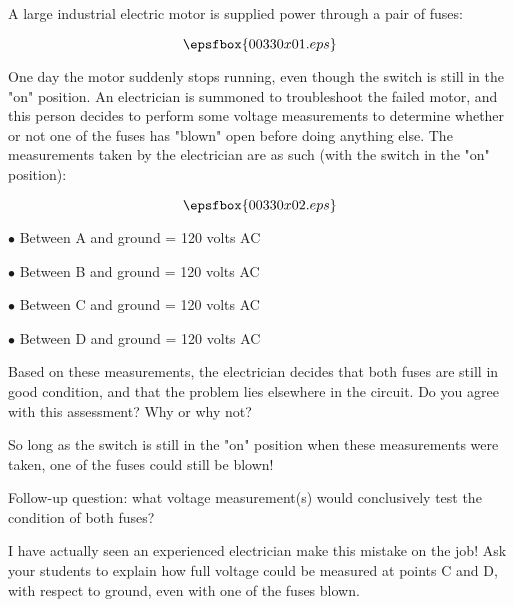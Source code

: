 

A large industrial electric motor is supplied power through a pair of fuses:

$$\epsfbox{00330x01.eps}$$

One day the motor suddenly stops running, even though the switch is still in the "on" position.  An electrician is summoned to troubleshoot the failed motor, and this person decides to perform some voltage measurements to determine whether or not one of the fuses has "blown" open before doing anything else.  The measurements taken by the electrician are as such (with the switch in the "on" position):

$$\epsfbox{00330x02.eps}$$

\medskip
\item{$\bullet$} Between A and ground = 120 volts AC
\item{$\bullet$} Between B and ground = 120 volts AC
\item{$\bullet$} Between C and ground = 120 volts AC
\item{$\bullet$} Between D and ground = 120 volts AC
\medskip

Based on these measurements, the electrician decides that both fuses are still in good condition, and that the problem lies elsewhere in the circuit.  Do you agree with this assessment?  Why or why not?







So long as the switch is still in the "on" position when these measurements were taken, one of the fuses could still be blown!

\vskip 10pt

Follow-up question: what voltage measurement(s) would conclusively test the condition of both fuses?







I have actually seen an experienced electrician make this mistake on the job!  Ask your students to explain how full voltage could be measured at points C and D, with respect to ground, even with one of the fuses blown.




